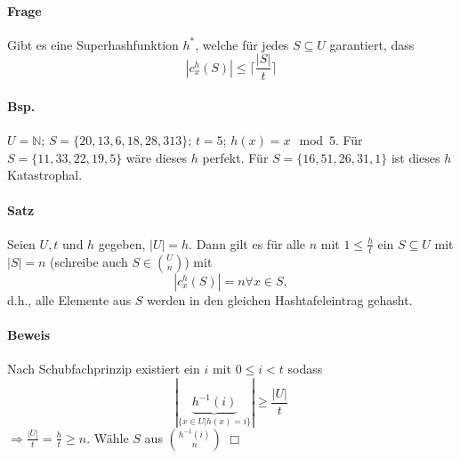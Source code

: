 \paragraph*{Frage} Gibt es eine Superhashfunktion $h^*$, welche für jedes $S \subseteq U$ garantiert, dass $$ |c_x^h(S)| \leq \lceil \frac{|S|}{t} \rceil $$

\paragraph*{Bsp.} $U=\mathbb{N}$; $S=\{ 20,13,6,18,28,313 \}$; $t=5$; $h(x)= x \mod 5$. Für $S=\{ 11,33,22,19,5 \}$ wäre dieses $h$ perfekt. Für $S=\{ 16,51,26,31,1 \}$ ist dieses $h$ Katastrophal.

\paragraph*{Satz} Seien $U,t$ und $h$ gegeben, $|U|=h$. Dann gilt es für alle $n$ mit $1 \leq \frac{h}{t}$ ein $S \subseteq U$ mit $|S|=n$ (schreibe auch $S \in {U \choose n} $) mit  $$ |c_x^h(S)| = n \forall x \in S, $$ d.h., alle Elemente aus $S$ werden in den gleichen Hashtafeleintrag gehasht.

\paragraph*{Beweis} Nach Schubfachprinzip existiert ein $i$ mit $0 \leq i < t$ sodass $$ |\underbrace{h^{-1}(i)}_{\{ x \in U | h(x)=i \}}| \geq \frac{|U|}{t} $$ $\Rightarrow \frac{|U|}{t} = \frac{h}{t} \geq n$. Wähle $S$ aus ${h^{-1}(i) \choose n}$ \hspace{8cm} $\Box$


